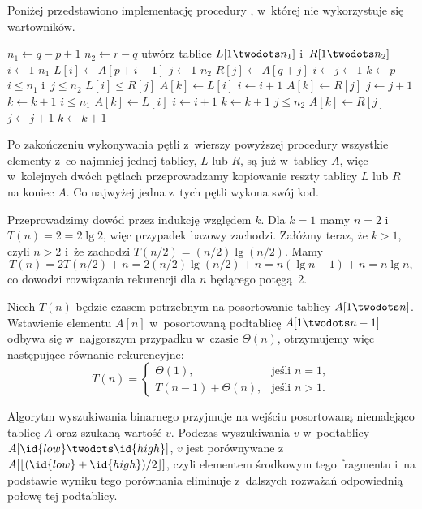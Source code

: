 \exercise %
Poniżej przedstawiono implementację procedury , w~której nie wykorzystuje się wartowników.
\begin{codebox}
\li	$n_1\gets q-p+1$
\li	$n_2\gets r-q$
\li	utwórz tablice $L[1\twodots n_1]$ i~$R[1\twodots n_2]$
\li	\For $i\gets1$ \To $n_1$
\li		\Do $L[i]\gets A[p+i-1]$
		\End
\li	\For $j\gets1$ \To $n_2$
\li		\Do $R[j]\gets A[q+j]$
		\End
\li	$i\gets j\gets1$
\li	$k\gets p$
\li	\While $i\le n_1$ i~$j\le n_2$ \label{li:merge'-while-begin}
\li		\Do
			\If $L[i]\le R[j]$
\li				\Then
					$A[k]\gets L[i]$
\li					$i\gets i+1$
\li				\Else
					$A[k]\gets R[j]$
\li					$j\gets j+1$
				\End
\li			$k\gets k+1$
		\End \label{li:merge'-while-end}
\li	\While $i\le n_1$
\li		\Do
			$A[k]\gets L[i]$
\li			$i\gets i+1$
\li			$k\gets k+1$
		\End
\li	\While $j\le n_2$
\li		\Do
			$A[k]\gets R[j]$
\li			$j\gets j+1$
\li			$k\gets k+1$
		\End
\end{codebox}
Po zakończeniu wykonywania pętli  z~wierszy \twodashes{\ref{li:merge'-while-begin}}{\ref{li:merge'-while-end}} powyższej procedury wszystkie elementy z~co najmniej jednej tablicy, $L$ lub $R$, są już w~tablicy $A$, więc w~kolejnych dwóch pętlach  przeprowadzamy kopiowanie reszty tablicy $L$ lub $R$ na koniec $A$. Co najwyżej jedna z~tych pętli wykona swój kod.

\exercise %
Przeprowadzimy dowód przez indukcję względem $k$. Dla $k=1$ mamy $n=2$ i~$T(n)=2=2\lg2$, więc przypadek bazowy zachodzi. Załóżmy teraz, że $k>1$, czyli $n>2$ i~że zachodzi $T(n/2)=(n/2)\lg(n/2)$. Mamy
\[
	T(n) = 2T(n/2)+n = 2(n/2)\lg(n/2)+n = n(\lg n-1)+n = n\lg n,
\]
co dowodzi rozwiązania rekurencji dla $n$ będącego potęgą~2.

\exercise %
Niech $T(n)$ będzie czasem potrzebnym na posortowanie tablicy $A[1\twodots n]$. Wstawienie elementu $A[n]$ w~posortowaną podtablicę $A[1\twodots n-1]$ odbywa się w~najgorszym przypadku w~czasie $\Theta(n)$, otrzymujemy więc następujące równanie rekurencyjne:
\[
	T(n) =
	\begin{cases}
		\Theta(1), & \text{jeśli $n=1$}, \\
		T(n-1)+\Theta(n), & \text{jeśli $n>1$}.
	\end{cases}
\]

\exercise %
Algorytm wyszukiwania binarnego przyjmuje na wejściu posortowaną niemalejąco tablicę $A$ oraz szukaną wartość $v$. Podczas wyszukiwania $v$ w~podtablicy $A[\id{low}\twodots\id{high}]$, $v$ jest porównywane z~$A[\lfloor(\id{low}+\id{high})/2\rfloor]$, czyli elementem środkowym tego fragmentu i~na podstawie wyniku tego porównania eliminuje z~dalszych rozważań odpowiednią połowę tej podtablicy.

